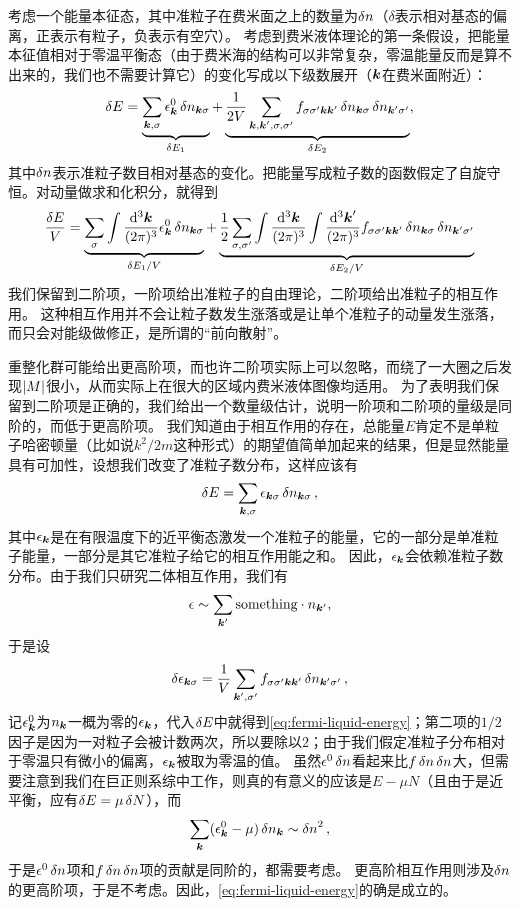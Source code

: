 \documentclass[hyperref, UTF8, a4paper]{ctexart}
\begin{document}
考虑一个能量本征态，其中准粒子在费米面之上的数量为$\var{n}$（$\delta$表示相对基态的偏离，正表示有粒子，负表示有空穴）。
考虑到费米液体理论的第一条假设，把能量本征值相对于零温平衡态（由于费米海的结构可以非常复杂，零温能量反而是算不出来的，我们也不需要计算它）的变化写成以下级数展开（$\vb*{k}$在费米面附近）：
\begin{equation}
    \var{E} = \underbrace{\sum_{\vb*{k}, \sigma} \epsilon^0_{\vb*{k}} \var{n_{\vb*{k} \sigma}}}_{\var{E_1}} + \underbrace{\frac{1}{2V} \sum_{\vb*{k}, \vb*{k}', \sigma, \sigma'} f_{\sigma \sigma' \vb*{k} \vb*{k}'} \var{n_{\vb*{k} \sigma}} \var{n_{\vb*{k}' \sigma'}}}_{\var{E_2}},
    \label{eq:fermi-liquid-energy}
\end{equation}
其中$\var{n}$表示准粒子数目相对基态的变化。把能量写成粒子数的函数假定了自旋守恒。对动量做求和化积分，就得到
\begin{equation}
    \frac{\var{E}}{V} = \underbrace{\sum_{\sigma} \int \frac{\dd[3]{\vb*{k}}}{(2\pi)^3} \epsilon^0_{\vb*{k}} \var{n_{\vb*{k} \sigma}}}_{\var{E_1} / V} + \underbrace{\frac{1}{2} \sum_{\sigma, \sigma'} \int \frac{\dd[3]{\vb*{k}}}{(2\pi)^3} \int \frac{\dd[3]{\vb*{k}'}}{(2\pi)^3} f_{\sigma \sigma' \vb*{k} \vb*{k}'} \var{n_{\vb*{k} \sigma}} \var{n_{\vb*{k}' \sigma'}}}_{\var{E_2} / V}
\end{equation}
我们保留到二阶项，一阶项给出准粒子的自由理论，二阶项给出准粒子的相互作用。
这种相互作用并不会让粒子数发生涨落或是让单个准粒子的动量发生涨落，而只会对能级做修正，是所谓的“前向散射”。

重整化群可能给出更高阶项，而也许二阶项实际上可以忽略，而绕了一大圈之后发现$\abs{M}$很小，从而实际上在很大的区域内费米液体图像均适用。
为了表明我们保留到二阶项是正确的，我们给出一个数量级估计，说明一阶项和二阶项的量级是同阶的，而低于更高阶项。
我们知道由于相互作用的存在，总能量$E$肯定不是单粒子哈密顿量（比如说$k^2/2m$这种形式）的期望值简单加起来的结果，但是显然能量具有可加性，设想我们改变了准粒子数分布，这样应该有
\[
    \var{E} = \sum_{\vb*{k}, \sigma} \epsilon_{\vb*{k} \sigma} \var{n_{\vb*{k} \sigma}},
\]
其中$\epsilon_{\vb*{k}}$是在有限温度下的近平衡态激发一个准粒子的能量，它的一部分是单准粒子能量，一部分是其它准粒子给它的相互作用能之和。
因此，$\epsilon_{\vb*{k}}$会依赖准粒子数分布。由于我们只研究二体相互作用，我们有
\[
    \epsilon \sim \sum_{\vb*{k}'} \text{something} \cdot n_{\vb*{k}'},
\]
于是设
\[
    \var{\epsilon_{\vb*{k} \sigma}} = \frac{1}{V} \sum_{\vb*{k}', \sigma'} f_{\sigma \sigma' \vb*{k} \vb*{k}'} \var{n_{\vb*{k}' \sigma'}},
\]
记$\epsilon_{\vb*{k}}^0$为$n_{\vb*{k}}$一概为零的$\epsilon_{\vb*{k}}$，代入$\var{E}$中就得到\eqref{eq:fermi-liquid-energy}；第二项的$1/2$因子是因为一对粒子会被计数两次，所以要除以$2$；由于我们假定准粒子分布相对于零温只有微小的偏离，$\epsilon_{\vb*{k}}$被取为零温的值。
虽然$\epsilon^0 \var{n}$看起来比$f\var{n} \var{n}$大，但需要注意到我们在巨正则系综中工作，则真的有意义的应该是$E-\mu N$（且由于是近平衡，应有$\var{E} = \mu \var{N}$），而
\[
    \sum_{\vb*{k}} (\epsilon^0_{\vb*{k}} - \mu) \var{n_{\vb*{k}}} \sim \var{n}^2,
\]
于是$\epsilon^0 \var{n}$项和$f\var{n} \var{n}$项的贡献是同阶的，都需要考虑。
更高阶相互作用则涉及$\var{n}$的更高阶项，于是不考虑。因此，\eqref{eq:fermi-liquid-energy}的确是成立的。
\end{document}
